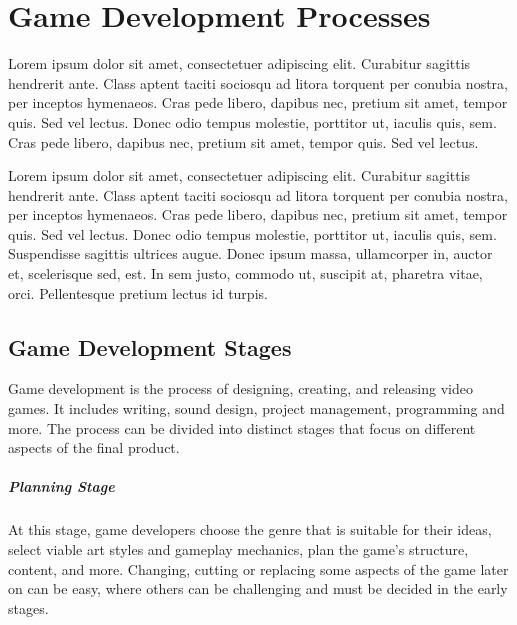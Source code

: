 \chapter{Game Development Processes}

\begin{chapterabstract}
	Lorem ipsum dolor sit amet, consectetuer adipiscing elit. Curabitur sagittis hendrerit ante. Class aptent taciti sociosqu ad litora torquent per conubia nostra, per inceptos hymenaeos. Cras pede libero, dapibus nec, pretium sit amet, tempor quis. Sed vel lectus. Donec odio tempus molestie, porttitor ut, iaculis quis, sem. Cras pede libero, dapibus nec, pretium sit amet, tempor quis. Sed vel lectus. 
\end{chapterabstract}

Lorem ipsum dolor sit amet, consectetuer adipiscing elit. Curabitur sagittis hendrerit ante. Class aptent taciti sociosqu ad litora torquent per conubia nostra, per inceptos hymenaeos. Cras pede libero, dapibus nec, pretium sit amet, tempor quis. Sed vel lectus. Donec odio tempus molestie, porttitor ut, iaculis quis, sem. Suspendisse sagittis ultrices augue. Donec ipsum massa, ullamcorper in, auctor et, scelerisque sed, est. In sem justo, commodo ut, suscipit at, pharetra vitae, orci. Pellentesque pretium lectus id turpis.

\section{Game Development Stages}
Game development is the process of designing, creating, and releasing video games. It includes writing, sound design, project management, programming and more. The process can be divided into distinct stages that focus on different aspects of the final product.

\paragraph{Planning Stage}
At this stage, game developers choose the genre that is suitable for their ideas, select viable art styles and gameplay mechanics, plan the game’s structure, content, and more. Changing, cutting or replacing some aspects of the game later on can be easy, where others can be challenging and must be decided in the early stages.

